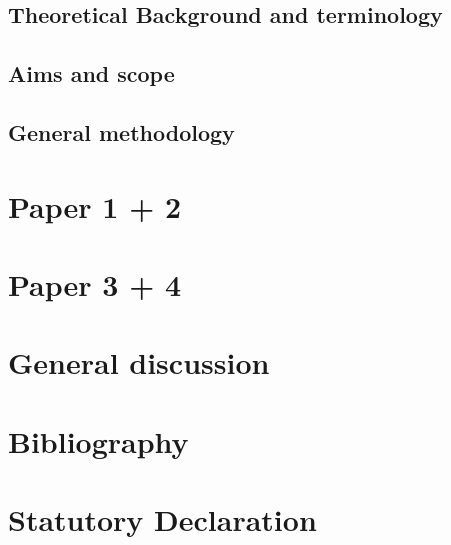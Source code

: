 \documentclass[11pt]{report}
\begin{document}
    \section{Theoretical Background and terminology}
        
    \label{sec:theory}

    \section{Aims and scope}
    
    \label{sec:aims_scope}

    \section{General methodology}
    
    \label{sec:methods}

\chapter{Paper 1 + 2}
\label{chap:res1}

\chapter{Paper 3 + 4}
\label{chap:res2}

\chapter{General discussion}
\label{chap:disc}

\chapter{Bibliography}



\chapter{Statutory Declaration}
\end{document}
